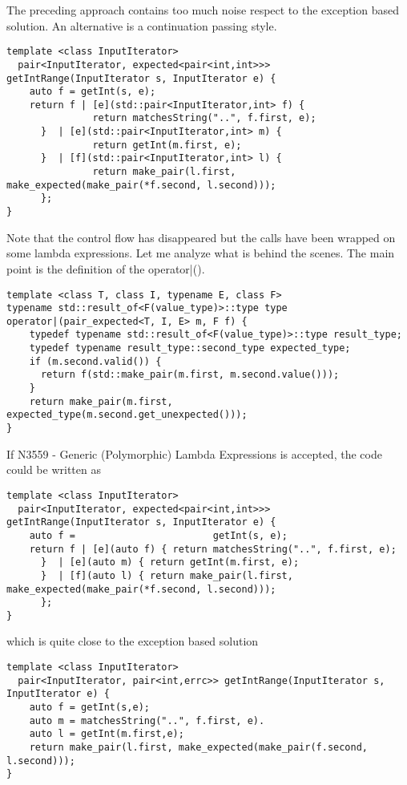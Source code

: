 \documentclass[a4paper,10pt]{article}
\begin{document}
The preceding approach contains too much noise respect to the exception based solution. An alternative is a continuation passing style. 

\begin{lstlisting}
template <class InputIterator>
  pair<InputIterator, expected<pair<int,int>>> getIntRange(InputIterator s, InputIterator e) {
    auto f = getInt(s, e);
    return f | [e](std::pair<InputIterator,int> f) {
    	       return matchesString("..", f.first, e); 
	  }  | [e](std::pair<InputIterator,int> m) {
               return getInt(m.first, e); 
	  }  | [f](std::pair<InputIterator,int> l) {
               return make_pair(l.first, make_expected(make_pair(*f.second, l.second))); 
	  };
}
\end{lstlisting}

Note that the control flow has disappeared but the calls have been wrapped on some lambda expressions. Let me analyze what is behind the scenes. The main point is the definition of the operator|(). 

\begin{lstlisting}
template <class T, class I, typename E, class F>
typename std::result_of<F(value_type)>::type type
operator|(pair_expected<T, I, E> m, F f) {
    typedef typename std::result_of<F(value_type)>::type result_type;
    typedef typename result_type::second_type expected_type;
    if (m.second.valid()) {
      return f(std::make_pair(m.first, m.second.value()));
    }
    return make_pair(m.first, expected_type(m.second.get_unexpected()));
}
\end{lstlisting}

If N3559 - Generic (Polymorphic) Lambda Expressions is accepted, the code could be written as

\begin{lstlisting}
template <class InputIterator>
  pair<InputIterator, expected<pair<int,int>>> getIntRange(InputIterator s, InputIterator e) {
    auto f =                        getInt(s, e);
    return f | [e](auto f) { return matchesString("..", f.first, e); 
	  }  | [e](auto m) { return getInt(m.first, e); 
	  }  | [f](auto l) { return make_pair(l.first, make_expected(make_pair(*f.second, l.second))); 
	  };
}
\end{lstlisting}

which is quite close to the exception based solution

\begin{lstlisting}
template <class InputIterator>
  pair<InputIterator, pair<int,errc>> getIntRange(InputIterator s, InputIterator e) {
    auto f = getInt(s,e);
    auto m = matchesString("..", f.first, e).
    auto l = getInt(m.first,e);       
    return make_pair(l.first, make_expected(make_pair(f.second, l.second)));
}
\end{lstlisting}
\end{document}
